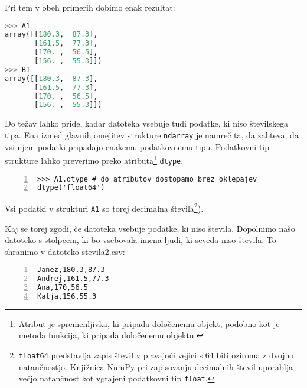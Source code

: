 Pri tem v obeh primerih dobimo enak rezultat:
\begin{lstlisting}[language=Python]
>>> A1
array([[180.3,  87.3],
       [161.5,  77.3],
       [170. ,  56.5],
       [156. ,  55.3]])
>>> B1
array([[180.3,  87.3],
       [161.5,  77.3],
       [170. ,  56.5],
       [156. ,  55.3]])
\end{lstlisting}
Do težav lahko pride, kadar datoteka vsebuje tudi podatke, ki niso številskega tipa. Ena izmed glavnih omejitev strukture \texttt{ndarray} je namreč ta, da zahteva, da vsi njeni podatki pripadajo enakemu podatkovnemu tipu. Podatkovni tip strukture lahko preverimo preko atributa\footnote{Atribut je spremenljivka, ki pripada določenemu objekt, podobno kot je metoda funkcija, ki pripada določenemu objektu.} \texttt{dtype}.  
\begin{lstlisting}[numbers=left]
>>> A1.dtype # do atributov dostopamo brez oklepajev
dtype('float64')
\end{lstlisting}
Vsi podatki v strukturi \texttt{A1} so torej decimalna števila\footnote{\texttt{float64} predstavlja zapis števil v plavajoči vejici s 64 biti oziroma z dvojno natančnostjo. Knjižnica NumPy pri zapisovanju decimalnih števil uporablja večjo natančnost kot vgrajeni podatkovni tip \texttt{float}.}). 

Kaj se torej zgodi, če datoteka vsebuje podatke, ki niso števila. Dopolnimo našo datoteko s stolpcem, ki bo vsebovala imena ljudi, ki seveda niso števila. To shranimo v datoteko {stevila2.csv}:
\begin{lstlisting}[numbers=left]
Janez,180.3,87.3
Andrej,161.5,77.3
Ana,170,56.5
Katja,156,55.3
\end{lstlisting}

